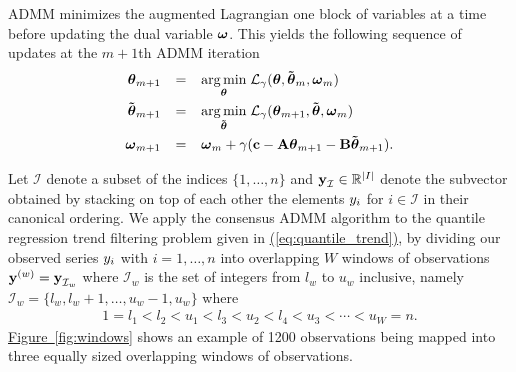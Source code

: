 \documentclass[12pt]{article}
\newcommand{\Eqn}[1]{\hyperref[eq:#1]{{\rm (\ref*{eq:#1})}}} %
\newcommand{\Fig}[1]{\hyperref[fig:#1]{Figure~\ref*{fig:#1}}} %
\newcommand{\Eqn}[1]{{(\ref{eq:#1})}} %
\newcommand{\Fig}[1]{{Figure~\ref{fig:#1}}} %
\newcommand{\Real}{\mathbb{R}}
\newcommand{\amp}{\mathop{\:\:\,}\nolimits}
\newcommand{\V}[1]{{\bm{\mathbf{\MakeLowercase{#1}}}}} %
\newcommand{\VE}[2]{\MakeLowercase{#1}_{#2}} %
\newcommand{\Vtilde}[1]{{\bm{\tilde \mathbf{\MakeLowercase{#1}}}}} %
\newcommand{\Vn}[2]{\V{#1}^{(#2)}} %
\newcommand{\M}[1]{{\bm{\mathbf{\MakeUppercase{#1}}}}} %
\begin{document}
ADMM minimizes the augmented Lagrangian one block of variables at a time before updating the dual variable $\V{\omega}$. This yields the following sequence of updates at the $m+1$th ADMM iteration
\begin{equation}
\label{eq:admm_updates}
\begin{split}
\V{\theta}_{m+1} & \amp = \amp \underset{\V{\theta}}{\arg\min}\; \mathcal{L}_\gamma(\V{\theta},\Vtilde{\theta}_{m}, \V{\omega}_{m}) \\
\Vtilde{\theta}_{m+1} & \amp = \amp \underset{\Vtilde{\theta}}{\arg\min}\; \mathcal{L}_\gamma(\V{\theta}_{m+1},\Vtilde{\theta}, \V{\omega}_{m}) \\
\V{\omega}_{m+1} & \amp = \amp \V{\omega}_{m} + \gamma(\V{c} - \M{A}\V{\theta}_{m+1} - \M{B}\Vtilde{\theta}_{m+1}).
\end{split}
\end{equation}



	Let $\mathcal{I}$ denote a subset of the indices $\{1, \ldots, n\}$ and $\V{y}_\mathcal{I} \in \Real^{\lvert I \rvert}$ denote the subvector obtained by stacking on top of each other the elements $\VE{y}{i}$ for $i \in \mathcal{I}$ in their canonical ordering.
	We apply the consensus ADMM algorithm to the quantile regression trend filtering problem given in \Eqn{quantile_trend}, by dividing our observed series $\VE{y}{i}$ with $i = 1, \ldots, n$ into overlapping $W$ windows of observations $\Vn{y}{w} = \V{y}_{\mathcal{I}_w}$ where $\mathcal{I}_w$ is the set of integers from $l_w$ to $u_w$ inclusive, namely $\mathcal{I}_w = \{l_w, l_w + 1, \ldots, u_w -1, u_w\}$ where
\begin{eqnarray*}
1 = l_{1} < l_{2} < u_{1} < l_{3} < u_{2} < l_{4} < u_{3} < \cdots < u_{W} = n.
\end{eqnarray*}
\Fig{windows} shows an example of 1200 observations being mapped into three equally sized overlapping windows of observations.
\end{document}

